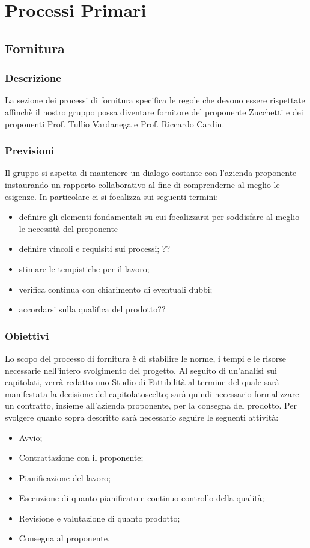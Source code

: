 \section{Processi Primari}

\subsection{Fornitura}
\subsubsection{Descrizione}
La sezione dei processi di fornitura specifica le regole che devono essere rispettate affinchè il nostro gruppo possa diventare fornitore del proponente Zucchetti e dei proponenti Prof. Tullio Vardanega e Prof. Riccardo Cardin.
\subsubsection{Previsioni}
Il gruppo si aspetta di mantenere un dialogo costante con l'azienda proponente instaurando un rapporto collaborativo al fine di comprenderne al meglio le esigenze. In particolare ci si focalizza sui seguenti termini:
\begin{itemize}
	\item definire gli elementi fondamentali su cui focalizzarsi per soddisfare al meglio le necessità del proponente
	\item definire vincoli e requisiti sui processi; ??
	\item stimare le tempistiche per il lavoro;
	\item verifica continua con chiarimento di eventuali dubbi;
	\item accordarsi sulla qualifica del prodotto??
\end{itemize}
\subsubsection{Obiettivi}
Lo scopo del processo di fornitura è di stabilire le norme, i tempi e le risorse necessarie nell'intero svolgimento del progetto.
Al seguito di un'analisi sui capitolati, verrà redatto uno Studio di Fattibilità al termine del quale sarà manifestata la decisione del capitolato\glosp scelto; sarà quindi necessario formalizzare un contratto, insieme all'azienda proponente, per la consegna del prodotto. 
Per svolgere quanto sopra descritto sarà necessario seguire le seguenti attività:
\begin{itemize}
	\item Avvio;
	\item Contrattazione con il proponente;
	\item Pianificazione del lavoro;
	\item Esecuzione di quanto pianificato e continuo controllo della qualità;
	\item Revisione e valutazione di quanto prodotto;
	\item Consegna al proponente.
\end{itemize}
